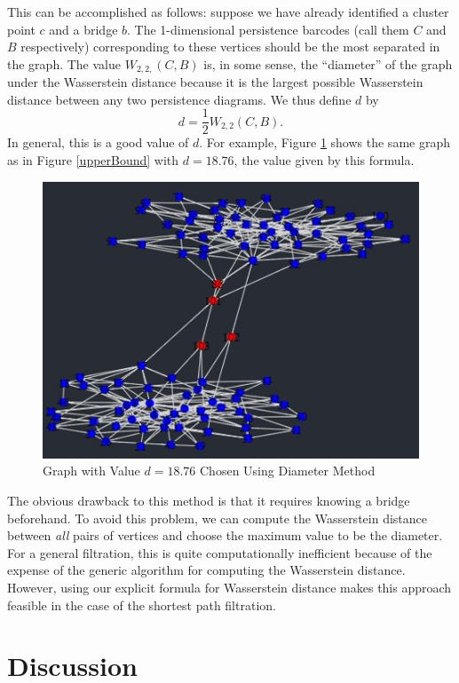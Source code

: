 \documentclass[12pt,a4paper]{amsart}
\numberwithin{equation}{section}
\theoremstyle{plain}
\theoremstyle{definition}
\begin{document}
This can be accomplished as follows: suppose we have already identified a cluster point $c$ and a bridge $b$. The 1-dimensional persistence barcodes (call them $C$ and $B$ respectively) corresponding to these vertices should be the most separated in the graph. The value $W_{2,2,}(C,B)$ is, in some sense, the ``diameter'' of the graph under the Wasserstein distance because it is the largest possible Wasserstein distance between any two persistence diagrams. We thus define $d$ by
\[ d = \frac{1}{2} W_{2,2}(C,B). \]
In general, this is a good value of $d$. For example, Figure \ref{ideald} shows the same graph as in Figure \ref{upperBound} with $d=18.76$, the value given by this formula.

\begin{figure}[h]
	\centering
	\includegraphics[scale=0.8]{IdealBridges.jpg}
	\caption{Graph with Value $d=18.76$ Chosen Using Diameter Method}
	\label{ideald}
\end{figure}
	
\newpage
	
The obvious drawback to this method is that it requires knowing a bridge beforehand. To avoid this problem, we can compute the Wasserstein distance between \textit{all} pairs of vertices and choose the maximum value to be the diameter. For a general filtration, this is quite computationally inefficient because of the expense of the generic algorithm for computing the Wasserstein distance. However, using our explicit formula for Wasserstein distance makes this approach feasible in the case of the shortest path filtration. 


\section*{Discussion}
\end{document}
